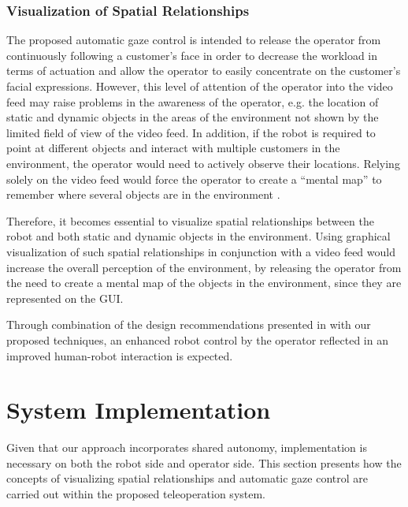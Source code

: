 \documentclass[a4paper, 10pt, conference]{ieeeconf}     %
\begin{document}
\subsubsection{Visualization of Spatial Relationships}
The proposed automatic gaze control is intended to release the operator from continuously following a customer's face in order to decrease the workload in terms of actuation and allow the operator to easily concentrate on the customer's facial expressions.
However, this level of attention of the operator into the video feed may raise problems in the awareness of the operator, e.g. the location of static and dynamic objects in the areas of the environment not shown by the limited field of view of the video feed. 
In addition, if the robot is required to point at different objects and interact with multiple customers in the environment, the operator would need to actively observe their locations.
Relying solely on the video feed would force the operator to create a ``mental map'' to remember where several objects are in the environment \cite{dejong:improving}.

Therefore, it becomes essential to visualize spatial relationships between the robot and both static and dynamic objects in the environment. 
Using graphical visualization of such spatial relationships in conjunction with a video feed would increase the overall perception of the environment, by releasing the operator from the need to create a mental map of the objects in the environment, since they are represented on the GUI.

Through combination of the design recommendations presented in \cite{nielsen:comparing} with our proposed techniques, an enhanced robot control by the operator reflected in an improved human-robot interaction is expected.

\section{System Implementation}
Given that our approach incorporates shared autonomy, implementation is necessary on both the robot side and operator side.
This section presents how the concepts of visualizing spatial relationships and automatic gaze control are carried out within the proposed teleoperation system. %
\end{document}
